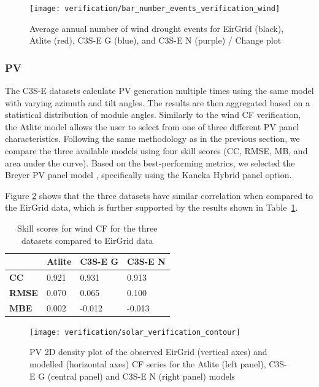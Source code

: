 \documentclass[a4paper, 11pt]{article}
\begin{document}
\begin{figure}[!ht]
	\centering
	\texttt{[image: verification/bar\_number\_events\_verification\_wind]}
	\caption{Average annual number of wind drought events for EirGrid (black), Atlite (red), C3S-E G (blue), and C3S-E N (purple) / Change plot}
	\label{fig:bar_number_events_verification_wind}
\end{figure}

\subsubsection{PV}
\label{sec:pv_verification}

The C3S-E datasets calculate PV generation multiple times using the same model with varying azimuth and tilt angles. The results are then aggregated based on a statistical distribution of module angles. Similarly to the wind CF verification, the Atlite model allows the user to select from one of three different PV panel characteristics. Following the same methodology as in the previous section, we compare the three available models using four skill scores (CC, RMSE, MB, and area under the curve). Based on the best-performing metrics, we selected the Breyer PV panel model \cite{beyer2004pv}, specifically using the Kaneka Hybrid panel option.

Figure \ref{fig:solar_verification_contour} shows that the three datasets have similar correlation when compared to the EirGrid data, which is further supported by the results shown in Table~\ref{tab:pv_skill_scores}.

\begin{table}[!ht]
	\centering
	\begin{tabular}{l|lll|}
	\cline{2-4}
	& \textbf{Atlite} & \textbf{C3S-E G} & \textbf{C3S-E N} \\ \hline
	\multicolumn{1}{|l|}{\textbf{CC}}   & 0.921           & 0.931            & 0.913            \\ \hline
	\multicolumn{1}{|l|}{\textbf{RMSE}} & 0.070           & 0.065            & 0.100            \\ \hline
	\multicolumn{1}{|l|}{\textbf{MBE}}   & 0.002           & -0.012           & -0.013           \\ \hline
	\end{tabular}
	\caption{Skill scores for wind CF for the three datasets compared to EirGrid data}
	\label{tab:pv_skill_scores}
\end{table}

\begin{figure}[h!]
	\centering
	\texttt{[image: verification/solar\_verification\_contour]}
	\caption{PV 2D density plot of the observed EirGrid (vertical axes) and modelled (horizontal axes) CF series for the Atlite  (left panel), C3S-E G (central panel) and C3S-E N (right panel) models}	
	\label{fig:solar_verification_contour}
\end{figure}
\end{document}
